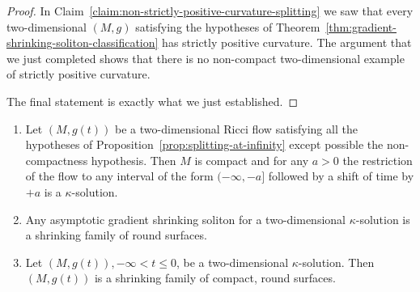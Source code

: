 \begin{proof}
In Claim~\ref{claim:non-strictly-positive-curvature-splitting} we saw that every two-dimensional $(M,g)$ satisfying
the hypotheses of Theorem~\ref{thm:gradient-shrinking-soliton-classification} has strictly positive curvature. The
argument that we just completed shows that there is no non-compact
two-dimensional example of strictly positive curvature.

The final statement  is exactly what we just established.
\end{proof}


\begin{corollary}\label{cor:two-dimensional-gradient-shrinking-soliton}
\label{2DGSS}
\begin{enumerate}
\item[(1)] Let $(M,g(t))$ be a two-dimensional Ricci flow satisfying all
the hypotheses of Proposition~\ref{prop:splitting-at-infinity} except possible the
non-compactness hypothesis. Then $M$ is compact and for any $a>0$
the restriction of the flow to any interval of the form
$(-\infty,-a]$ followed by a shift of time by $+a$ is a
$\kappa$-solution.
\item[(2)] Any asymptotic gradient
shrinking soliton for a two-dimensional $\kappa$-solution is a shrinking family
of round surfaces.
\item[(3)] Let $(M,g(t)), -\infty<t\le 0$, be a
two-dimensional $\kappa$-solution. Then $(M,g(t))$ is a shrinking family of
compact, round surfaces.
\end{enumerate}
\end{corollary}


